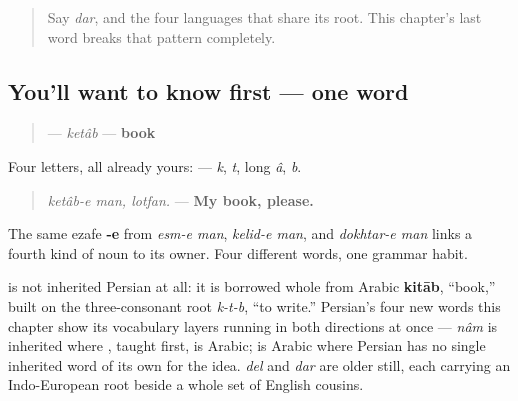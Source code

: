 \label{lesson:FA-C12-ketab}



\begin{quote}
Say \emph{dar}, and the four languages that share its root. This chapter's last word breaks that pattern completely.
\end{quote}

\subsection*{You'll want to know first — one word}
\begin{quote}
\textbf{} — \emph{ketâb} — \textbf{book}
\end{quote}

Four letters, all already yours: \textbf{   } — \emph{k}, \emph{t}, long \emph{â}, \emph{b}.

\begin{grammarlens}[title={Grammar Lens: a possessed object, the pattern one more time}]
\begin{quote}
\emph{ketâb-e man, lotfan.} — \textbf{My book, please.}
\end{quote}

The same ezafe \textbf{-e} from \emph{esm-e man}, \emph{kelid-e man}, and \emph{dokhtar-e man} links a fourth kind of noun to its owner. Four different words, one grammar habit.
\end{grammarlens}

\begin{cousinweb}
\textbf{} is not inherited Persian at all: it is borrowed whole from Arabic \textbf{kitāb}, \textquotedblleft{}book,\textquotedblright{} built on the three-consonant root \emph{k-t-b}, \textquotedblleft{}to write.\textquotedblright{} Persian's four new words this chapter show its vocabulary layers running in both directions at once — \emph{nâm} is inherited where \textbf{}, taught first, is Arabic; \textbf{} is Arabic where Persian has no single inherited word of its own for the idea. \emph{del} and \emph{dar} are older still, each carrying an Indo-European root beside a whole set of English cousins.
\end{cousinweb}

